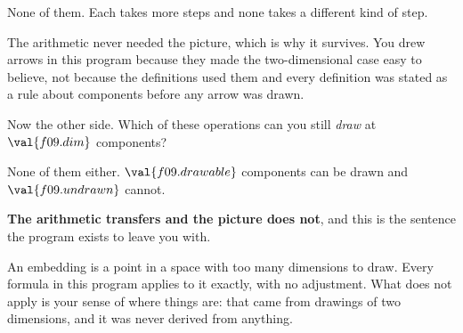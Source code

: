 \begin{fr}
\begin{ansblock}
None of them. Each takes more steps and none takes a different kind of step.
\end{ansblock}

The arithmetic never needed the picture, which is why it survives. You drew
arrows in this program because they made the two-dimensional case easy to
believe, not because the definitions used them \dash{} and every definition
was stated as a rule about components before any arrow was drawn.

Now the other side. Which of these operations can you still \emph{draw} at
$\val{f09.dim}$ components?
\nextframe
\end{fr}

\begin{fr}
\begin{ansblock}
None of them either. $\val{f09.drawable}$ components can be drawn and
$\val{f09.undrawn}$ cannot.
\end{ansblock}

\textbf{The arithmetic transfers and the picture does not}, and this is the
sentence the program exists to leave you with.

An embedding is a point in a space with too many dimensions to draw. Every
formula in this program applies to it exactly, with no adjustment. What does
not apply is your sense of where things are: that came from drawings of two
dimensions, and it was never derived from anything.
\end{fr}


